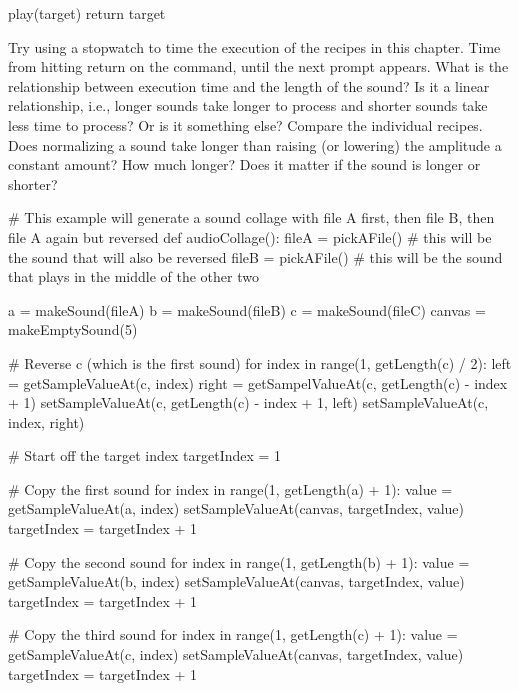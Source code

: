 \begin{exercises}
\begin{ex}
\begin{example}
  play(target)
  return target
\end{example}
\end{ex}


\begin{ex}
Try using a stopwatch to time the execution of the recipes in this
chapter.  Time from hitting return on the command, until the next
prompt appears.  What is the relationship between execution time
and the length of the sound?  Is it a linear relationship, i.e.,
longer sounds take longer to process and shorter sounds take less
time to process?  Or is it something else?  Compare the individual
recipes.  Does normalizing a sound take longer than raising (or
lowering) the amplitude a constant amount?  How much longer?  Does
it matter if the sound is longer or shorter?
\end{ex}

\begin{ex}
\begin{example}
# This example will generate a sound collage with file A first, then file
B, then file A again but reversed
def audioCollage():
  fileA = pickAFile() # this will be the sound that will also be reversed
  fileB = pickAFile() # this will be the sound that plays in the middle of
the other two

  a = makeSound(fileA)
  b = makeSound(fileB)
  c = makeSound(fileC)
  canvas = makeEmptySound(5)

  # Reverse c (which is the first sound)
  for index in range(1, getLength(c) / 2):
    left = getSampleValueAt(c, index)
    right = getSampelValueAt(c, getLength(c) - index + 1)
    setSampleValueAt(c, getLength(c) - index + 1, left)
    setSampleValueAt(c, index, right)

  # Start off the target index
  targetIndex = 1

  # Copy the first sound
  for index in range(1, getLength(a) + 1):
    value = getSampleValueAt(a, index)
    setSampleValueAt(canvas, targetIndex, value)
    targetIndex = targetIndex + 1

  # Copy the second sound
  for index in range(1, getLength(b) + 1):
    value = getSampleValueAt(b, index)
    setSampleValueAt(canvas, targetIndex, value)
    targetIndex = targetIndex + 1

  # Copy the third sound
  for index in range(1, getLength(c) + 1):
    value = getSampleValueAt(c, index)
    setSampleValueAt(canvas, targetIndex, value)
    targetIndex = targetIndex + 1
\end{example}
\end{ex}


\end{exercises}
